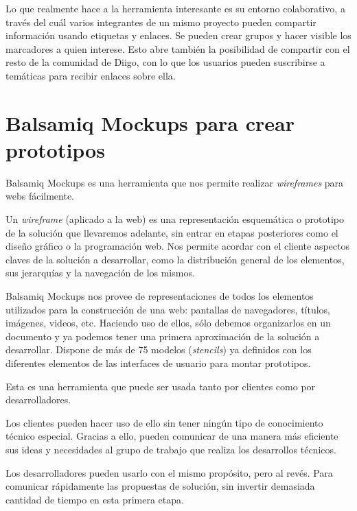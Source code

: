   Lo que realmente hace a la herramienta interesante es su entorno colaborativo, a través del cuál varios integrantes de un mismo proyecto pueden compartir información usando etiquetas y enlaces. Se pueden crear grupos y hacer visible los marcadores a quien interese. Esto abre también la posibilidad de compartir con el resto de la comunidad de Diigo, con lo que los usuarios pueden suscribirse a temáticas para recibir enlaces sobre ella.  
  


\section{Balsamiq Mockups para crear prototipos} %
  \label{sec:balsamiq_mockups_para_crear_prototipos}

  Balsamiq Mockups es una herramienta que nos permite realizar {\it wireframes} para webs fácilmente.

  Un {\it wireframe} (aplicado a la web) es una representación esquemática o prototipo de la solución que llevaremos adelante, sin entrar en etapas posteriores como el diseño gráfico o la programación web. Nos permite acordar con el cliente aspectos claves de la solución a desarrollar, como la distribución general de los elementos, sus jerarquías y la navegación de los mismos.

  Balsamiq Mockups nos provee de representaciones de todos los elementos utilizados para la construcción de una web: pantallas de navegadores, títulos, imágenes, videos, etc. Haciendo uso de ellos, sólo debemos organizarlos en un documento y ya podemos tener una primera aproximación de la solución a desarrollar. Dispone de más de 75 modelos ({\it stencils}) ya definidos con los diferentes elementos de las interfaces de usuario para montar prototipos.

  Esta es una herramienta que puede ser usada tanto por clientes como por desarrolladores.

  Los clientes pueden hacer uso de ello sin tener ningún tipo de conocimiento técnico especial. Gracias a ello, pueden comunicar de una manera más eficiente sus ideas y necesidades al grupo de trabajo que realiza los desarrollos técnicos.

  Los desarrolladores pueden usarlo con el mismo propósito, pero al revés. Para comunicar rápidamente las propuestas de solución, sin invertir demasiada cantidad de tiempo en esta primera etapa.


%
%
\newpage
\thispagestyle{empty}